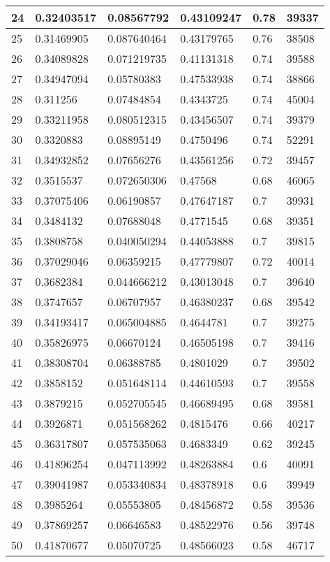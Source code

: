 \begin{longtable}{|l|l|l|l|l|l|}
24 & 0.32403517 & 0.08567792 & 0.43109247 & 0.78 & 39337 \\ \hline 
25 & 0.31469905 & 0.087640464 & 0.43179765 & 0.76 & 38508 \\ \hline 
26 & 0.34089828 & 0.071219735 & 0.41131318 & 0.74 & 39588 \\ \hline 
27 & 0.34947094 & 0.05780383 & 0.47533938 & 0.74 & 38866 \\ \hline 
28 & 0.311256 & 0.07484854 & 0.4343725 & 0.74 & 45004 \\ \hline 
29 & 0.33211958 & 0.080512315 & 0.43456507 & 0.74 & 39379 \\ \hline 
30 & 0.3320883 & 0.08895149 & 0.4750496 & 0.74 & 52291 \\ \hline 
31 & 0.34932852 & 0.07656276 & 0.43561256 & 0.72 & 39457 \\ \hline 
32 & 0.3515537 & 0.072650306 & 0.47568 & 0.68 & 46065 \\ \hline 
33 & 0.37075406 & 0.06190857 & 0.47647187 & 0.7 & 39931 \\ \hline 
34 & 0.3484132 & 0.07688048 & 0.4771545 & 0.68 & 39351 \\ \hline 
35 & 0.3808758 & 0.040050294 & 0.44053888 & 0.7 & 39815 \\ \hline 
36 & 0.37029046 & 0.06359215 & 0.47779807 & 0.72 & 40014 \\ \hline 
37 & 0.3682384 & 0.044666212 & 0.43013048 & 0.7 & 39640 \\ \hline 
38 & 0.3747657 & 0.06707957 & 0.46380237 & 0.68 & 39542 \\ \hline 
39 & 0.34193417 & 0.065004885 & 0.4644781 & 0.7 & 39275 \\ \hline 
40 & 0.35826975 & 0.06670124 & 0.46505198 & 0.7 & 39416 \\ \hline 
41 & 0.38308704 & 0.06388785 & 0.4801029 & 0.7 & 39502 \\ \hline 
42 & 0.3858152 & 0.051648114 & 0.44610593 & 0.7 & 39558 \\ \hline 
43 & 0.3879215 & 0.052705545 & 0.46689495 & 0.68 & 39581 \\ \hline 
44 & 0.3926871 & 0.051568262 & 0.4815476 & 0.66 & 40217 \\ \hline 
45 & 0.36317807 & 0.057535063 & 0.4683349 & 0.62 & 39245 \\ \hline 
46 & 0.41896254 & 0.047113992 & 0.48263884 & 0.6 & 40091 \\ \hline 
47 & 0.39041987 & 0.053340834 & 0.48378918 & 0.6 & 39949 \\ \hline 
48 & 0.3985264 & 0.05553805 & 0.48456872 & 0.58 & 39536 \\ \hline 
49 & 0.37869257 & 0.06646583 & 0.48522976 & 0.56 & 39748 \\ \hline 
50 & 0.41870677 & 0.05070725 & 0.48566023 & 0.58 & 46717 \\ \hline 
\end{longtable}